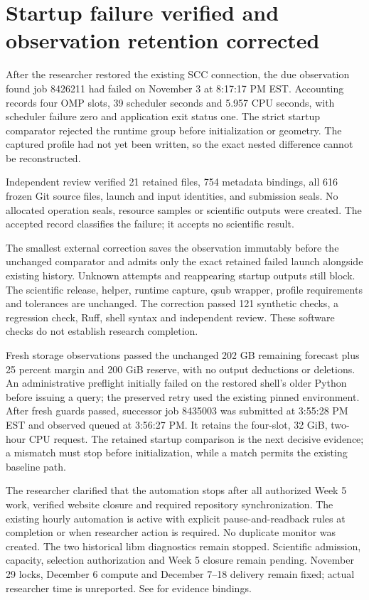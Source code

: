 \section{Startup failure verified and observation retention corrected}

After the researcher restored the existing SCC connection, the due observation
found job 8426211 had failed on November 3 at 8:17:17 PM EST. Accounting records
four OMP slots, 39 scheduler seconds and 5.957 CPU seconds, with scheduler failure
zero and application exit status one. The strict startup comparator rejected the
runtime group before initialization or geometry. The captured profile had not
yet been written, so the exact nested difference cannot be reconstructed.

Independent review verified 21 retained files, 754 metadata bindings, all 616
frozen Git source files, launch and input identities, and submission seals.
No allocated operation seals, resource samples or scientific outputs were created.
The accepted record classifies the failure; it accepts no scientific result.

The smallest external correction saves the observation immutably before the
unchanged comparator and admits only the exact retained failed launch alongside
existing history. Unknown attempts and reappearing startup outputs still block.
The scientific release, helper, runtime capture, qsub wrapper, profile requirements
and tolerances are unchanged. The correction passed 121 synthetic checks, a
regression check, Ruff, shell syntax and independent review. These software checks
do not establish research completion.

Fresh storage observations passed the unchanged 202 GB remaining forecast plus
25 percent margin and 200 GiB reserve, with no output deductions or deletions.
An administrative preflight initially failed on the restored shell's older Python
before issuing a query; the preserved retry used the existing pinned environment.
After fresh guards passed, successor job 8435003 was submitted at 3:55:28 PM EST
and observed queued at 3:56:27 PM. It retains the four-slot, 32 GiB, two-hour CPU
request. The retained startup comparison is the next decisive evidence; a mismatch
must stop before initialization, while a match permits the existing baseline path.

The researcher clarified that the automation stops after all authorized Week 5
work, verified website closure and required repository synchronization. The
existing hourly automation is active with explicit pause-and-readback rules at
completion or when researcher action is required. No duplicate monitor was created.
The two historical libm diagnostics remain stopped. Scientific admission, capacity,
selection authorization and Week 5 closure remain pending. November 29 locks,
December 6 compute and December 7--18 delivery remain fixed; actual researcher
time is unreported. See  for evidence bindings.
